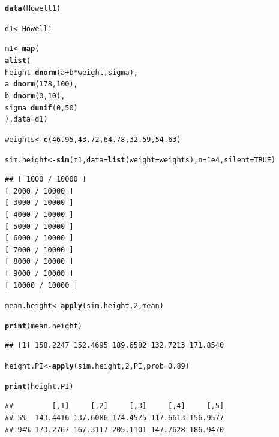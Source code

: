 \documentclass[12pt]{article}\usepackage[]{graphicx}\usepackage[]{color}
\makeatletter
\newcommand{\hlnum}[1]{\textcolor[rgb]{0.686,0.059,0.569}{#1}}%
\newcommand{\hlopt}[1]{\textcolor[rgb]{0,0,0}{#1}}%
\newcommand{\hlstd}[1]{\textcolor[rgb]{0.345,0.345,0.345}{#1}}%
\newcommand{\hlkwb}[1]{\textcolor[rgb]{0.69,0.353,0.396}{#1}}%
\newcommand{\hlkwc}[1]{\textcolor[rgb]{0.333,0.667,0.333}{#1}}%
\newcommand{\hlkwd}[1]{\textcolor[rgb]{0.737,0.353,0.396}{\textbf{#1}}}%
\newenvironment{kframe}{%
 \def\at@end@of@kframe{}%
 \ifinner\ifhmode%
  \def\at@end@of@kframe{\end{minipage}}%
  \begin{minipage}{\columnwidth}%
 \fi\fi%
 \def\FrameCommand##1{\hskip\@totalleftmargin \hskip-\fboxsep
 \colorbox{shadecolor}{##1}\hskip-\fboxsep
     \hskip-\linewidth \hskip-\@totalleftmargin \hskip\columnwidth}%
 \MakeFramed {\advance\hsize-\width
   \@totalleftmargin\z@ \linewidth\hsize
   \@setminipage}}%
 {\par\unskip\endMakeFramed%
 \at@end@of@kframe}
\newenvironment{knitrout}{}{} %
\makeatother
\begin{document}
\begin{knitrout}
\color{fgcolor}\begin{kframe}
\begin{alltt}
\hlkwd{data}\hlstd{(Howell1)}

\hlstd{d1} \hlkwb{<-} \hlstd{Howell1}

\hlstd{m1} \hlkwb{<-} \hlkwd{map}\hlstd{(}
  \hlkwd{alist}\hlstd{(}
    \hlstd{height} \hlopt{~} \hlkwd{dnorm}\hlstd{(a} \hlopt{+} \hlstd{b}\hlopt{*}\hlstd{weight, sigma),}
    \hlstd{a} \hlopt{~} \hlkwd{dnorm}\hlstd{(}\hlnum{178}\hlstd{,} \hlnum{100}\hlstd{),}
    \hlstd{b} \hlopt{~} \hlkwd{dnorm}\hlstd{(}\hlnum{0}\hlstd{,} \hlnum{10}\hlstd{),}
    \hlstd{sigma} \hlopt{~} \hlkwd{dunif}\hlstd{(}\hlnum{0}\hlstd{,} \hlnum{50}\hlstd{)}
  \hlstd{),} \hlkwc{data} \hlstd{= d1)}

\hlstd{weights} \hlkwb{<-} \hlkwd{c}\hlstd{(}\hlnum{46.95}\hlstd{,} \hlnum{43.72}\hlstd{,} \hlnum{64.78}\hlstd{,} \hlnum{32.59}\hlstd{,} \hlnum{54.63}\hlstd{)}

\hlstd{sim.height} \hlkwb{<-} \hlkwd{sim}\hlstd{(m1,} \hlkwc{data}\hlstd{=}\hlkwd{list}\hlstd{(}\hlkwc{weight}\hlstd{=weights),} \hlkwc{n} \hlstd{=} \hlnum{1e4}\hlstd{,} \hlkwc{silent} \hlstd{=} \hlnum{TRUE}\hlstd{)}
\end{alltt}
\begin{verbatim}
## [ 1000 / 10000 ]
[ 2000 / 10000 ]
[ 3000 / 10000 ]
[ 4000 / 10000 ]
[ 5000 / 10000 ]
[ 6000 / 10000 ]
[ 7000 / 10000 ]
[ 8000 / 10000 ]
[ 9000 / 10000 ]
[ 10000 / 10000 ]

\end{verbatim}
\begin{alltt}
\hlstd{mean.height} \hlkwb{<-} \hlkwd{apply}\hlstd{(sim.height,} \hlnum{2}\hlstd{, mean)}

\hlkwd{print}\hlstd{(mean.height)}
\end{alltt}
\begin{verbatim}
## [1] 158.2247 152.4695 189.6582 132.7213 171.8540
\end{verbatim}
\begin{alltt}
\hlstd{height.PI} \hlkwb{<-} \hlkwd{apply}\hlstd{(sim.height,} \hlnum{2}\hlstd{, PI,} \hlkwc{prob}\hlstd{=}\hlnum{0.89}\hlstd{)}

\hlkwd{print}\hlstd{(height.PI)}
\end{alltt}
\begin{verbatim}
##         [,1]     [,2]     [,3]     [,4]     [,5]
## 5%  143.4416 137.6086 174.4575 117.6613 156.9577
## 94% 173.2767 167.3117 205.1101 147.7628 186.9470
\end{verbatim}
\end{kframe}
\end{knitrout}
\end{document}
